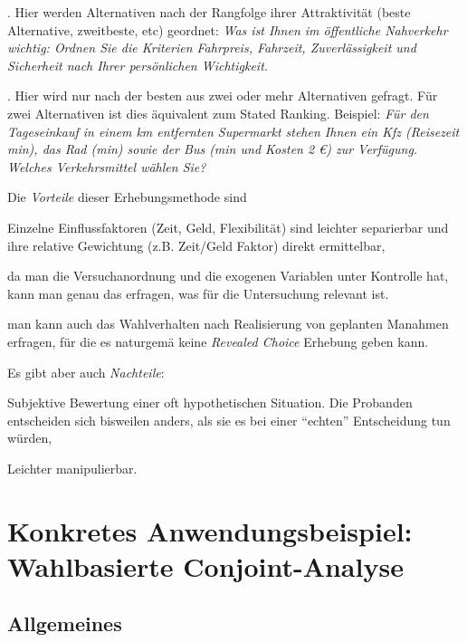 \item[(b)] . Hier werden
Alternativen nach der  Rangfolge ihrer Attraktivit\"at (beste
Alternative, zweitbeste, etc) 
geordnet: \textit{Was ist Ihnen im \"offentliche Nahverkehr wichtig:
  Ordnen Sie die Kriterien Fahrpreis, Fahrzeit, Zuverl\"assigkeit und
  Sicherheit nach Ihrer pers\"onlichen Wichtigkeit.}

\item[(c)] . Hier wird nur nach der besten aus
zwei oder mehr Alternativen gefragt. F\"ur zwei Alternativen ist dies
\"aquivalent zum Stated Ranking. Beispiel: \textit{F\"ur den
  Tageseinkauf in einem \unit[3]{km} entfernten Supermarkt 
stehen Ihnen ein Kfz (Reisezeit \unit[10]{min}), das Rad
(\unit[15]{min}) sowie der Bus (\unit[15]{min} und Kosten 2 \euro{}) zur
Verf\"ugung. Welches Verkehrsmittel
w\"ahlen Sie?}

\ei

 Die \textit{Vorteile} dieser Erhebungsmethode sind
\bi
\item Einzelne Einflussfaktoren (Zeit, Geld, Flexibilit\"at) sind
leichter separierbar und ihre relative Gewichtung (z.B. Zeit/Geld
Faktor) direkt ermittelbar,
\item da man die Versuchanordnung und die exogenen Variablen unter
  Kontrolle hat, kann man genau das erfragen, was f\"ur die
  Untersuchung relevant ist.
\item man kann auch das Wahlverhalten nach Realisierung von geplanten
  Ma\3nahmen erfragen, f\"ur die es naturgem\"a\3 keine \emph{Revealed
  Choice} Erhebung geben kann. 
\ei

Es gibt aber auch \textit{Nachteile}:
\bi
\item Subjektive Bewertung einer oft hypothetischen Situation. Die
Probanden entscheiden sich bisweilen anders, als sie es bei einer
``echten'' Entscheidung tun w\"urden,
\item Leichter manipulierbar.
\ei




\section{\label{sec:conjoint}Konkretes Anwendungsbeispiel:
  Wahlbasierte Conjoint-Analyse} 

\subsection{Allgemeines}

